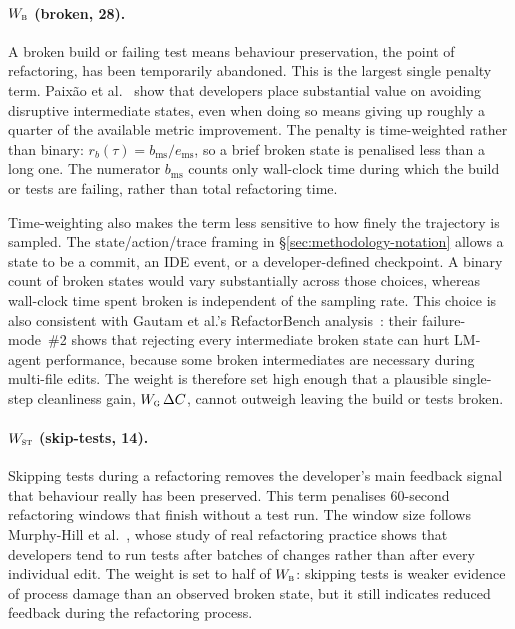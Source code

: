 \paragraph{$W_{\textsc{b}}$ (broken, 28).}
A broken build or failing test means behaviour preservation, the point of refactoring, has been temporarily abandoned. This is the largest single penalty term. Paix{\~a}o et al.~\cite{paixao2017balancing} show that developers place substantial value on avoiding disruptive intermediate states, even when doing so means giving up roughly a quarter of the available metric improvement. The penalty is time-weighted rather than binary: $r_b(\tau) = b_{\mathrm{ms}} / e_{\mathrm{ms}}$, so a brief broken state is penalised less than a long one. The numerator $b_{\mathrm{ms}}$ counts only wall-clock time during which the build or tests are failing, rather than total refactoring time.

Time-weighting also makes the term less sensitive to how finely the trajectory is sampled. The state/action/trace framing in \S\ref{sec:methodology-notation} allows a state to be a commit, an IDE event, or a developer-defined checkpoint. A binary count of broken states would vary substantially across those choices, whereas wall-clock time spent broken is independent of the sampling rate. This choice is also consistent with Gautam et al.'s RefactorBench analysis~\cite{gautam2025refactorbench}: their failure-mode~\#2 shows that rejecting every intermediate broken state can hurt LM-agent performance, because some broken intermediates are necessary during multi-file edits. The weight is therefore set high enough that a plausible single-step cleanliness gain, $W_{\textsc{g}}\,\Delta C$, cannot outweigh leaving the build or tests broken.

\paragraph{$W_{\textsc{st}}$ (skip-tests, 14).}
Skipping tests during a refactoring removes the developer's main feedback signal that behaviour really has been preserved. This term penalises 60-second refactoring windows that finish without a test run. The window size follows Murphy-Hill et al.~\cite{murphyhill2009howrefactor}, whose study of real refactoring practice shows that developers tend to run tests after batches of changes rather than after every individual edit. The weight is set to half of $W_{\textsc{b}}$: skipping tests is weaker evidence of process damage than an observed broken state, but it still indicates reduced feedback during the refactoring process.

